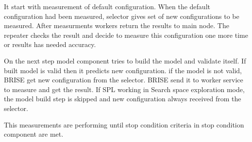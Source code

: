 It start with measurement of default configuration. When the default configuration had been measured, selector gives set of new configurations to be measured. After measurments workers return the results to main node. The repeater checks the result and decide to measure this configuration one more time or results has needed accuracy. 

On the next step model component tries to build the model and validate itself. If built model is valid then it predicts new configuration. if the model is not valid, BRISE get new configuration from the selector. BRISE send it to worker service to measure and get the result. If SPL working in Search space exploration mode, the model build step is skipped and new configuration always received from the selector. 

This measurements are performing until stop condition criteria in stop condition component are met.









